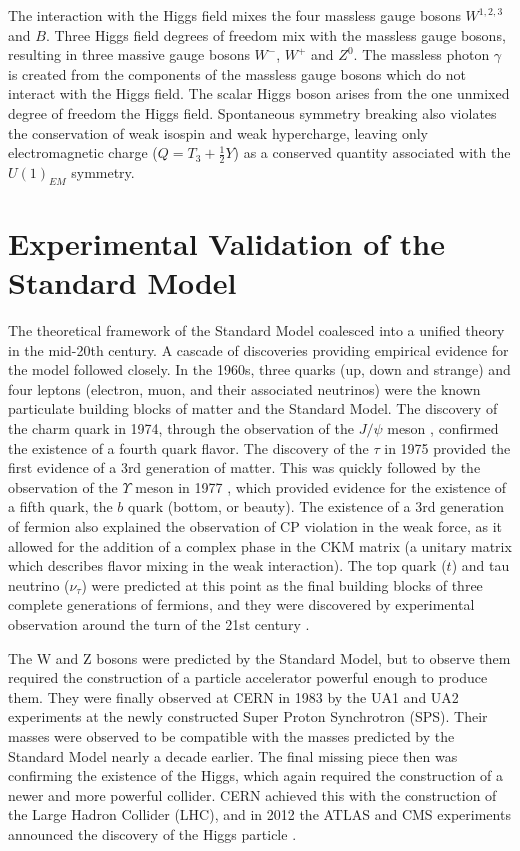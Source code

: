 The interaction with the Higgs field mixes the four massless gauge bosons $W^{1,2,3}$ and $B$. Three Higgs field degrees of freedom mix with the massless gauge bosons, resulting in three massive gauge bosons $W^-$, $W^+$ and $Z^0$. The massless photon $\gamma$ is created from the components of the massless gauge bosons which do not interact with the Higgs field. The scalar Higgs boson arises from the one unmixed degree of freedom the Higgs field. Spontaneous symmetry breaking also violates the conservation of weak isospin and weak hypercharge, leaving only electromagnetic charge ($Q = T_3 + \frac{1}{2}Y$) as a conserved quantity associated with the $U(1)_{EM}$ symmetry. 

\section{Experimental Validation of the Standard Model}

The theoretical framework of the Standard Model coalesced into a unified theory in the mid-20th century. A cascade of discoveries providing empirical evidence for the model followed closely. In the 1960s, three quarks (up, down and strange) and four leptons (electron, muon, and their associated neutrinos) were the known particulate building blocks of matter and the Standard Model. The discovery of the charm quark in 1974, through the observation of the $J/\psi$ meson \cite{SLAC_J}\cite{BNL_J}, confirmed the existence of a fourth quark flavor. The discovery of the $\tau$ in 1975 \cite{tau} provided the first evidence of a 3rd generation of matter. This was quickly followed by the observation of the $\Upsilon$ meson in 1977 \cite{upsilon}, which provided evidence for the existence of a fifth quark, the $b$ quark (bottom, or beauty). The existence of a 3rd generation of fermion also explained the observation of CP violation in the weak force, as it allowed for the addition of a complex phase in the CKM matrix (a unitary matrix which describes flavor mixing in the weak interaction). The top quark ($t$) and tau neutrino ($\nu_\tau$) were predicted at this point as the final building blocks of three complete generations of fermions, and they were discovered by experimental observation around the turn of the 21st century \cite{top_CDF} \cite{top_D0} \cite{tau_nu}. \par

The W and Z bosons were predicted by the Standard Model, but to observe them required the construction of a particle accelerator powerful enough to produce them. They were finally observed at CERN in 1983 by the UA1 and UA2 experiments \cite{UA1} \cite{UA2} at the newly constructed Super Proton Synchrotron (SPS). Their masses were observed to be compatible with the masses predicted by the Standard Model nearly a decade earlier. The final missing piece then was confirming the existence of the Higgs, which again required the construction of a newer and more powerful collider. CERN achieved this with the construction of the Large Hadron Collider (LHC), and in 2012 the ATLAS and CMS experiments announced the discovery of the Higgs particle \cite{higgs_CMS} \cite{higgs_ATLAS}. 

